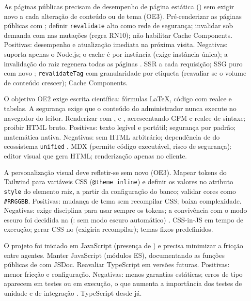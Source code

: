 {As páginas públicas precisam de desempenho de página estática () sem exigir novo  a cada alteração de conteúdo ou de tema (OE3).}
{Pré-renderizar as páginas públicas com ; definir \texttt{revalidate} alto como rede de segurança; invalidar sob demanda com  nas mutações (regra RN10); não habilitar Cache Components.}
{Positivas: desempenho e atualização imediata na próxima visita. Negativas: suporta apenas o  Node.js; o cache é por instância (exige instância única); a invalidação do  raiz regenera todas as páginas \cite{nextjsdocs}.}
{SSR a cada requisição; SSG puro com novo ; \texttt{revalidateTag} com granularidade por etiqueta (reavaliar se o volume de conteúdo crescer); Cache Components.}

{O objetivo OE2 exige escrita científica: fórmulas \LaTeX{}, código com realce e tabelas. A segurança exige que o conteúdo do administrador nunca execute  no navegador do leitor.}
{Renderizar com ,  e , acrescentando GFM e realce de sintaxe; proibir HTML bruto.}
{Positivas: texto legível e portátil; segurança por padrão; matemática nativa. Negativas: sem HTML arbitrário; dependência de  do ecossistema \texttt{unified} \cite{unifiedjs,reactmarkdown,katex}.}
{MDX (permite código executável, risco de segurança); editor visual que gera HTML; renderização apenas no cliente.}

{A personalização visual deve refletir-se sem novo  (OE3).}
{Mapear tokens do Tailwind para variáveis CSS (\texttt{@theme inline}) e definir os valores no atributo \texttt{style} do elemento raiz, a partir da configuração do banco; validar cores como \texttt{\#RRGGBB}.}
{Positivas: mudança de tema sem recompilar CSS; baixa complexidade. Negativas: exige disciplina para usar sempre os tokens; a convivência com o modo escuro foi decidida na  (: sem modo escuro automático) \cite{tailwinddocs,mdncssvars}.}
{CSS-in-JS em tempo de execução; gerar CSS no  (exigiria recompilar); temas fixos predefinidos.}

{O projeto foi iniciado em JavaScript (presença de ) e precisa minimizar a fricção entre agentes.}
{Manter JavaScript (módulos ES), documentando as funções públicas de  com JSDoc. Reavaliar TypeScript em versões futuras.}
{Positivas: menor fricção e configuração. Negativas: menos garantias estáticas; erros de tipo aparecem em testes ou em execução, o que aumenta a importância dos testes de unidade e de integração \cite{bierman2014typescript,andreasen2017survey}.}
{TypeScript desde já.}

